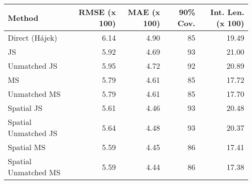 
\begin{tabular}{lrrrr}
\toprule
Method & RMSE (x 100) & MAE (x 100) & 90\% Cov. & Int. Len. (x 100)\\
\midrule
Direct (Hájek) & 6.14 & 4.90 & 85 & 19.49\\
JS & 5.92 & 4.69 & 93 & 21.00\\
Unmatched JS & 5.95 & 4.72 & 92 & 20.89\\
MS & 5.79 & 4.61 & 85 & 17.72\\
Unmatched MS & 5.79 & 4.61 & 85 & 17.70\\
Spatial JS & 5.61 & 4.46 & 93 & 20.48\\
Spatial Unmatched JS & 5.64 & 4.48 & 93 & 20.37\\
Spatial MS & 5.59 & 4.45 & 86 & 17.41\\
Spatial Unmatched MS & 5.59 & 4.44 & 86 & 17.38\\
\bottomrule
\end{tabular}
